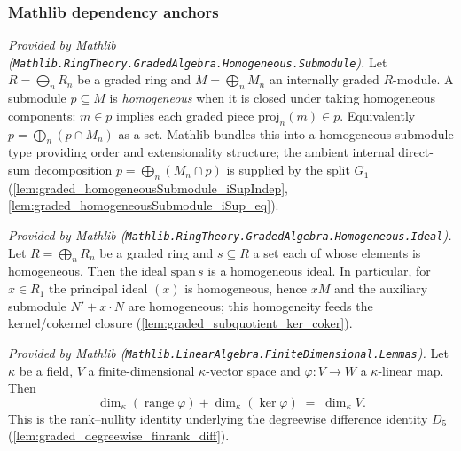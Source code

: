 \subsubsection*{Mathlib dependency anchors}

\begin{lemma}
  \label{lem:submodule_isHomogeneous_mathlib}
  \mathlibok
  \textit{Provided by Mathlib
  (\texttt{Mathlib.RingTheory.GradedAlgebra.Homogeneous.Submodule}).}
  Let \(R = \bigoplus_n R_n\) be a graded ring and \(M = \bigoplus_n M_n\) an
  internally graded \(R\)-module. A submodule \(p \subseteq M\) is
  \emph{homogeneous} when it is closed under taking homogeneous components:
  \(m \in p\) implies each graded piece \(\mathrm{proj}_n(m) \in p\). Equivalently
  \(p = \bigoplus_n (p \cap M_n)\) as a set. Mathlib bundles this into a homogeneous
  submodule type providing order and extensionality structure; the ambient internal
  direct-sum decomposition \(p = \bigoplus_n (M_n \cap p)\) is supplied by the split
  \(G_1\) (\cref{lem:graded_homogeneousSubmodule_iSupIndep},
  \cref{lem:graded_homogeneousSubmodule_iSup_eq}).
\end{lemma}

\begin{lemma}
  \label{lem:ideal_homogeneous_span_mathlib}
  \mathlibok
  \textit{Provided by Mathlib
  (\texttt{Mathlib.RingTheory.GradedAlgebra.Homogeneous.Ideal}).}
  Let \(R = \bigoplus_n R_n\) be a graded ring and \(s \subseteq R\) a set each of
  whose elements is homogeneous. Then the ideal \(\mathrm{span}\,s\) is a
  homogeneous ideal. In particular, for \(x \in R_1\) the principal ideal \((x)\)
  is homogeneous, hence \(xM\) and the auxiliary submodule \(N' + x \cdot N\) are
  homogeneous; this homogeneity feeds the kernel/cokernel closure
  (\cref{lem:graded_subquotient_ker_coker}).
\end{lemma}

\begin{lemma}
  \label{lem:finrank_range_add_finrank_ker_mathlib}
  \mathlibok
  \textit{Provided by Mathlib
  (\texttt{Mathlib.LinearAlgebra.FiniteDimensional.Lemmas}).}
  Let \(\kappa\) be a field, \(V\) a finite-dimensional \(\kappa\)-vector space and
  \(\varphi : V \to W\) a \(\kappa\)-linear map. Then
  \[
    \dim_\kappa(\operatorname{range}\varphi) + \dim_\kappa(\ker\varphi)
      \;=\; \dim_\kappa V .
  \]
  This is the rank--nullity identity underlying the degreewise difference identity
  \(D_5\) (\cref{lem:graded_degreewise_finrank_diff}).
\end{lemma}

